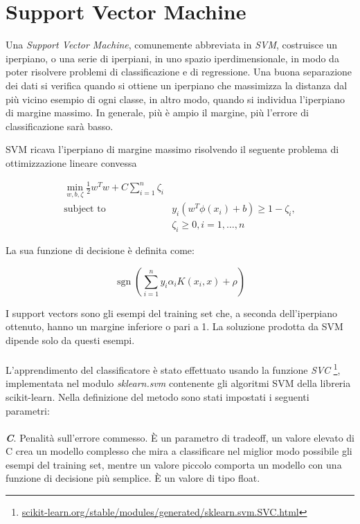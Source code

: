 \documentclass[12pt,a4paper,oneside,hidelinks]{report}
\DeclareMathOperator*{\sgn}{sgn}
\begin{document}
\section{Support Vector Machine}
Una \textit{Support Vector Machine}, comunemente abbreviata in \textit{SVM}, costruisce un iperpiano, o una serie di iperpiani, in uno spazio iperdimensionale, in modo da poter risolvere problemi di classificazione e di regressione. Una buona separazione dei dati si verifica quando si ottiene un iperpiano che massimizza la distanza dal più vicino esempio di ogni classe, in altro modo, quando si individua l'iperpiano di margine massimo. In generale, più è ampio il margine, più l'errore di classificazione sarà basso.

SVM ricava l'iperpiano di margine massimo risolvendo il seguente problema di ottimizzazione lineare convessa

\begin{equation} \label{uno}
\begin{split}
\min_ {w, b, \zeta} \frac{1}{2} w^T w + C \sum_{i=1}^{n} \zeta_i \\
\textrm {subject to } & y_i (w^T \phi (x_i) + b) \geq 1 - \zeta_i, \\
& \zeta_i \geq 0, i=1, \dotsc ,n
\end{split}
\end{equation}

La sua funzione di decisione è definita come:

\begin{equation} \label{due}
\sgn(\sum_{i=1}^n y_i \alpha_i K(x_i, x) + \rho)
\end{equation}

I support vectors sono gli esempi del training set che, a seconda dell'iperpiano ottenuto, hanno un margine inferiore o pari a 1. La soluzione prodotta da SVM dipende solo da questi esempi.

\paragraph*{}
L'apprendimento del classificatore è stato effettuato usando la funzione \textit{SVC} \footnote{\url{scikit-learn.org/stable/modules/generated/sklearn.svm.SVC.html}}, implementata nel modulo \textit{sklearn.svm} contenente gli algoritmi SVM della libreria scikit-learn. Nella definizione del metodo sono stati impostati i seguenti parametri:

\paragraph*{}
\textbf{\textit{C}}. Penalità sull'errore commesso. È un parametro di tradeoff, un valore elevato di C crea un modello complesso che mira a classificare nel miglior modo possibile gli esempi del training set, mentre un valore piccolo comporta un modello con una funzione di decisione più semplice. È un valore di tipo float. 
\end{document}
